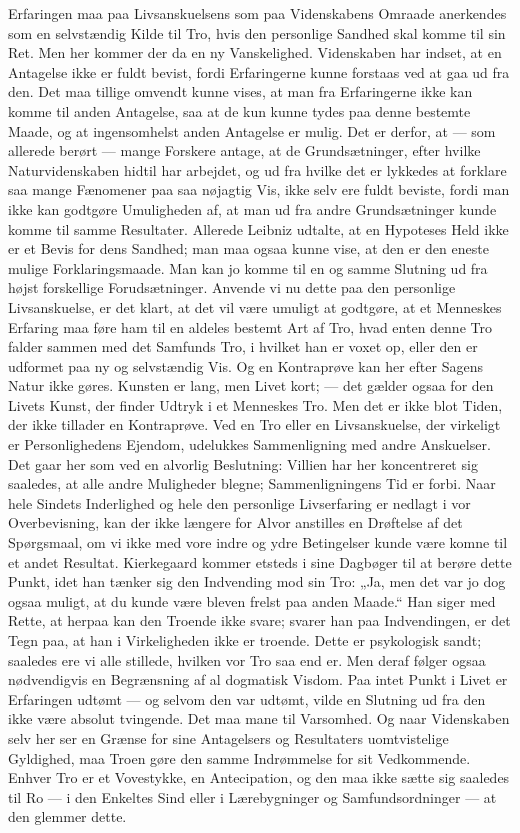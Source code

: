 \documentclass[12pt,a4paper]{article}
\newcommand{\opage}[1]{\marginnote{\footnotesize\textit{[#1]}}}
\begin{document}
Erfaringen maa paa Livsanskuelsens som paa Videnskabens Omraade anerkendes som
en selvstændig Kilde til Tro, hvis den personlige Sandhed skal komme til sin
Ret. Men her kommer der da en ny Vanskelighed. Videnskaben har indset, at en
Antagelse ikke er fuldt bevist, fordi Erfaringerne kunne forstaas ved at gaa ud
fra den. Det maa tillige omvendt kunne vises, at man \opage{54} fra Erfaringerne ikke kan
komme til anden Antagelse, saa at de kun kunne tydes paa denne bestemte Maade,
og at ingensomhelst anden Antagelse er mulig. Det er derfor, at --- som allerede
berørt --- mange Forskere antage, at de Grundsætninger, efter hvilke
Naturvidenskaben hidtil har arbejdet, og ud fra hvilke det er lykkedes at
forklare saa mange Fænomener paa saa nøjagtig Vis, ikke selv ere fuldt beviste,
fordi man ikke kan godtgøre Umuligheden af, at man ud fra andre Grundsætninger
kunde komme til samme Resultater. Allerede Leibniz udtalte, at en Hypoteses Held
ikke er et Bevis for dens Sandhed; man maa ogsaa kunne vise, at den er den
eneste mulige Forklaringsmaade. Man kan jo komme til en og samme Slutning ud fra
højst forskellige Forudsætninger. Anvende vi nu dette paa den personlige
Livsanskuelse, er det klart, at det vil være umuligt at godtgøre, at et
Menneskes Erfaring maa føre ham til en aldeles bestemt Art af Tro, hvad enten
denne Tro falder sammen med det Samfunds Tro, i hvilket han er voxet op, eller
den er udformet paa ny og selvstændig Vis. Og en Kontraprøve kan her efter
Sagens Natur ikke gøres. Kunsten er lang, men Livet kort; --- det gælder ogsaa
for den Livets Kunst, der finder Udtryk i et Menneskes Tro. Men det er ikke blot
Tiden, der ikke tillader en Kontraprøve. Ved en Tro eller en Livsanskuelse, der
virkeligt er Personlighedens Ejendom, udelukkes Sammenligning med andre
Anskuelser. Det gaar her som ved en alvorlig Beslutning: Villien har her
koncentreret sig saaledes, at alle andre Muligheder blegne; Sammenligningens Tid
er forbi. Naar hele Sindets Inderlighed og hele den personlige Livserfaring er
nedlagt i vor Overbevisning, kan der ikke længere for Alvor anstilles en
Drøftelse af det Spørgsmaal, om vi ikke med vore indre og ydre Betingelser kunde
være komne til et andet Resultat. Kierkegaard kommer etsteds i sine Dagbøger til
at berøre dette Punkt, idet han tænker sig \opage{55} den Indvending mod sin Tro: „Ja, men
det var jo dog ogsaa muligt, at du kunde være bleven frelst paa anden Maade.“
Han siger med Rette, at herpaa kan den Troende ikke svare; svarer han paa
Indvendingen, er det Tegn paa, at han i Virkeligheden ikke er troende. Dette er
psykologisk sandt; saaledes ere vi alle stillede, hvilken vor Tro saa end er.
Men deraf følger ogsaa nødvendigvis en Begrænsning af al dogmatisk Visdom. Paa
intet Punkt i Livet er Erfaringen udtømt --- og selvom den var udtømt, vilde en
Slutning ud fra den ikke være absolut tvingende. Det maa mane til Varsomhed. Og
naar Videnskaben selv her ser en Grænse for sine Antagelsers og Resultaters
uomtvistelige Gyldighed, maa Troen gøre den samme Indrømmelse for sit
Vedkommende. Enhver Tro er et Vovestykke, en Antecipation, og den maa ikke sætte
sig saaledes til Ro --- i den Enkeltes Sind eller i Lærebygninger og
Samfundsordninger --- at den glemmer dette.
\end{document}
